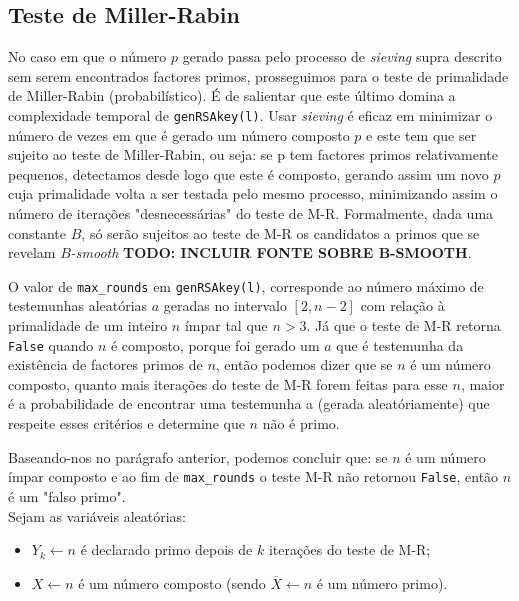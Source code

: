 \documentclass[dvipsnames]{article}
\begin{document}
\subsection{Teste de Miller-Rabin}

No caso em que o número $p$ gerado passa pelo processo de \textit{sieving} supra descrito sem serem encontrados factores primos, prosseguimos para o teste de primalidade de Miller-Rabin (probabilístico). É de salientar que este último domina a complexidade temporal de \texttt{genRSAkey(l)}. Usar \textit{sieving} é eficaz em minimizar o número de vezes em que é gerado um número composto $p$ e este tem que ser sujeito ao teste de Miller-Rabin, ou seja: se p tem factores primos relativamente pequenos, detectamos desde logo que este é composto, gerando assim um novo $p$ cuja primalidade volta a ser testada pelo mesmo processo, minimizando assim o número de iterações "desnecessárias" do teste de M-R. Formalmente, dada uma constante $B$, só serão sujeitos ao teste de M-R os candidatos a primos que se revelam $B$\textit{-smooth} \textbf{TODO: INCLUIR FONTE SOBRE B-SMOOTH}.

\vskip 0.4cm

\noindent O valor de \texttt{max\_rounds} em \texttt{genRSAkey(l)}, corresponde ao número máximo de testemunhas aleatórias $a$ geradas no intervalo $[2,n-2]$ com relação à primalidade de um inteiro $n$ ímpar tal que $n>3$. Já que o teste de M-R retorna \texttt{False} quando $n$ é composto, porque foi gerado um $a$ que é testemunha da existência de factores primos de $n$, então podemos dizer que se $n$ é um número composto, quanto mais iterações do teste de M-R forem feitas para esse $n$, maior é a probabilidade de encontrar uma testemunha a (gerada aleatóriamente) que respeite esses critérios e determine que $n$ não é primo.

\vskip 0.4cm

\noindent Baseando-nos no parágrafo anterior, podemos concluir que: se $n$ é um número ímpar composto e ao fim de \texttt{max\_rounds} o teste M-R não retornou \texttt{False}, então $n$ é um "falso primo".\\

\noindent Sejam as variáveis aleatórias:

\begin{itemize}
  \item $Y_k \leftarrow n$ é declarado primo depois de $k$ iterações do teste de M-R;
  \item $X \leftarrow n$ é um número composto (sendo $\overline{X} \leftarrow n$ é um número primo).
\end{itemize}
\end{document}
